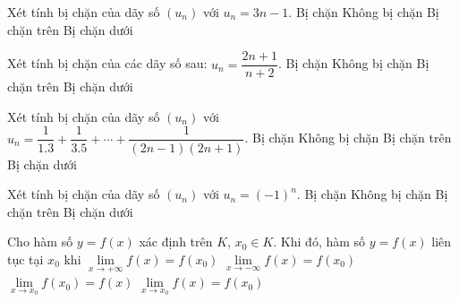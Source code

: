 \begin{ex}%
	Xét tính bị chặn của dãy số  $(u_n)$ với $u_n=3n-1$.
	\choice 
		{Bị  chặn}
		{Không  bị chặn}
		{Bị chặn trên} 
		{\True Bị  chặn dưới}
\end{ex}

\begin{ex}%
	 Xét tính bị chặn của các dãy số sau: $u_n=\dfrac{2n+1}{n+2}$.
	\choice 
		{\True Bị chặn} 
		{Không bị chặn} 
		{Bị chặn trên} 
		{Bị chặn  dưới}
\end{ex}

\begin{ex}%
	Xét  tính bị chặn của dãy số $(u_n)$ với $u_n=\dfrac{1}{1.3}+\dfrac{1}{3.5}+\cdots +\dfrac{1}{(2n-1)(2n+1)}$.
	\choice 
		{\True Bị chặn} 
		 {Không bị chặn}
		 {Bị chặn trên}
		{Bị chặn  dưới}
\end{ex}

\begin{ex}%
	Xét tính bị chặn của dãy số $(u_n)$ với  $u_n=(-1)^n$.
	\choice 
		{\True Bị  chặn}
		 {Không bị chặn}
		{Bị chặn trên} 
		{Bị chặn dưới} 
\end{ex}

\begin{ex}%
	Cho hàm số $y=f(x)$ xác định trên  $K$, $x_0\in K$. Khi đó, hàm số $y=f(x)$ liên tục tại $x_0$ khi
	\choice 
		{$\lim\limits_{x \to  +\infty}f(x)=f\left( x_0 \right)$}
		{$\lim\limits_{x  \to -\infty}f(x)=f\left( x_0 \right)$}
		{$\lim\limits_{x \to x_0}f\left( x_0 \right)=f(x)$} 
		 {\True $\lim\limits_{x \to x_0}f(x)=f\left( x_0 \right)$}
\end{ex}

